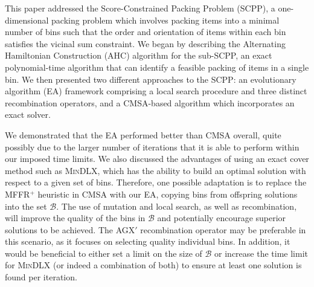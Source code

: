 \documentclass[a4paper,11pt,authoryear]{elsarticle}
\begin{document}
\noindent This paper addressed the Score-Constrained Packing Problem (SCPP), a one-dimensional packing problem which involves packing items into a minimal number of bins such that the order and orientation of items within each bin satisfies the vicinal sum constraint. We began by describing the Alternating Hamiltonian Construction (AHC) algorithm for the sub-SCPP, an exact polynomial-time algorithm that can identify a feasible packing of items in a single bin. We then presented two different approaches to the SCPP: an evolutionary algorithm (EA) framework comprising a local search procedure and three distinct recombination operators, and a CMSA-based algorithm which incorporates an exact solver.


We demonstrated that the EA performed better than CMSA overall, quite possibly due to the larger number of iterations that it is able to perform within our imposed time limits. We also discussed the advantages of using an exact cover method such as \textsc{MinDLX}, which has the ability to build an optimal solution with respect to a given set of bins. Therefore, one possible adaptation is to replace the MFFR$^+$ heuristic in CMSA with our EA, copying bins from offspring solutions into the set $\mathcal{B}$. The use of mutation and local search, as well as recombination, will improve the quality of the bins in $\mathcal{B}$ and potentially encourage superior solutions to be achieved. The AGX$'$ recombination operator may be preferable in this scenario, as it focuses on selecting quality individual bins. In addition, it would be beneficial to either set a limit on the size of $\mathcal{B}$ or increase the time limit for \textsc{MinDLX} (or indeed a combination of both) to ensure at least one solution is found per iteration.
\end{document}
